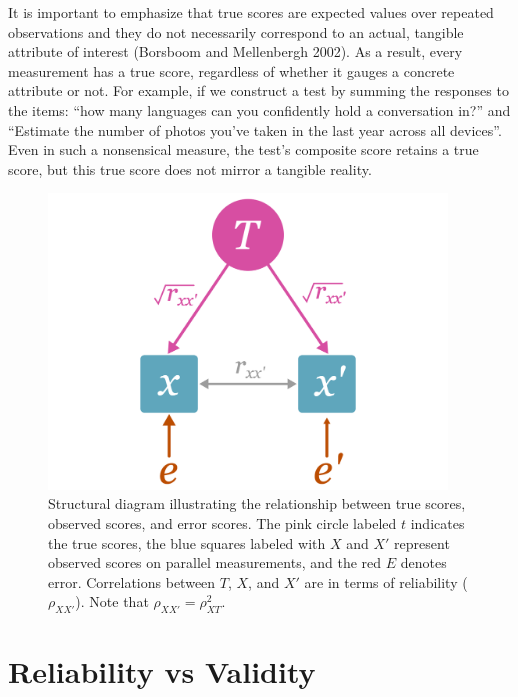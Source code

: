 \documentclass[
  letterpaper,
  DIV=11,
  numbers=noendperiod]{scrreprt}
\begin{document}
It is important to emphasize that true scores are expected values over
repeated observations and they do not necessarily correspond to an
actual, tangible attribute of interest (Borsboom and Mellenbergh 2002).
As a result, every measurement has a true score, regardless of whether
it gauges a concrete attribute or not. For example, if we construct a
test by summing the responses to the items: ``how many languages can you
confidently hold a conversation in?'' and ``Estimate the number of
photos you've taken in the last year across all devices''. Even in such
a nonsensical measure, the test's composite score retains a true score,
but this true score does not mirror a tangible reality.

\begin{figure}[H]

{\centering \includegraphics[width=4.16667in,height=\textheight]{figure/unreliability_diagram_1.png}

}

\caption{\label{fig-rel}Structural diagram illustrating the relationship
between true scores, observed scores, and error scores. The pink circle
labeled \(t\) indicates the true scores, the blue squares labeled with
\(X\) and \(X'\) represent observed scores on parallel measurements, and
the red \(E\) denotes error. Correlations between \(T\), \(X\), and
\(X'\) are in terms of reliability (\(\rho_{XX'}\)). Note that
\(\rho_{XX'}=\rho_{XT}^2\).}

\end{figure}

\hypertarget{reliability-vs-validity}{%
\section{Reliability vs Validity}\label{reliability-vs-validity}}
\end{document}
